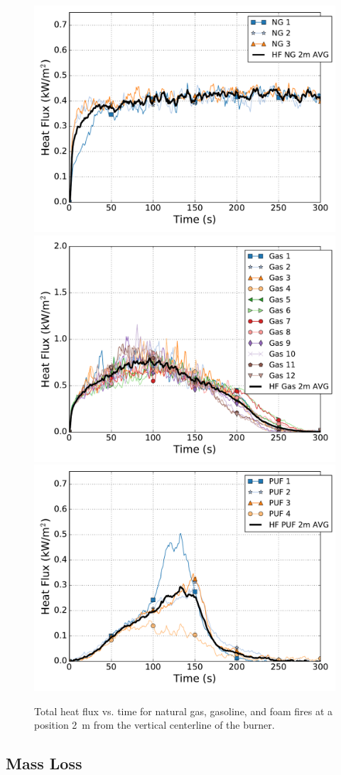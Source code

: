 \documentclass[twoside]{uocthesis}
\begin{document}
{\begin{figure}[p]
  \centering
  \includegraphics[width=.635\columnwidth]{../Figures/HF_NG_2m}\\
  \includegraphics[width=.635\columnwidth]{../Figures/HF_Gas_2m}\\
  \includegraphics[width=.635\columnwidth]{../Figures/HF_PUF_2m}\\
  \caption[Total heat flux vs. time for natural gas, gasoline, and foam fires at 2~m]{Total heat flux vs. time for natural gas, gasoline, and foam fires at a position 2~m from the vertical centerline of the burner.}
  \label{Flux_2m}
\end{figure}

\subsection{Mass Loss}

}
\end{document}

